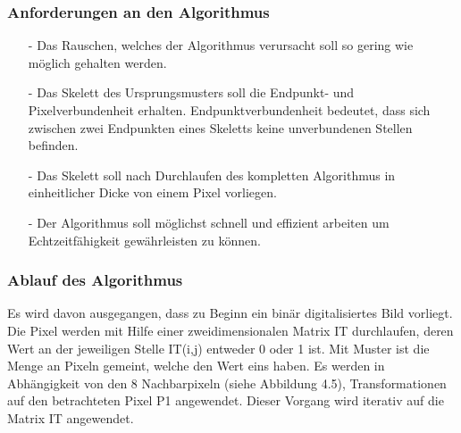 \subsubsection{Anforderungen an den Algorithmus}

\begin{itemize}
\item[-] Das Rauschen, welches der Algorithmus verursacht soll so gering wie möglich gehalten werden.
\item[-] Das Skelett des Ursprungsmusters soll die Endpunkt- und Pixelverbundenheit erhalten.
Endpunktverbundenheit bedeutet, dass sich zwischen zwei Endpunkten eines Skeletts keine unverbundenen Stellen befinden.
\item[-] Das Skelett soll nach Durchlaufen des kompletten Algorithmus in einheitlicher Dicke von einem Pixel vorliegen.
\item[-] Der Algorithmus soll möglichst schnell und effizient arbeiten um Echtzeitfähigkeit gewährleisten zu können. \\
\end{itemize}

\subsubsection{Ablauf des Algorithmus}

Es wird davon ausgegangen, dass zu Beginn ein binär digitalisiertes Bild vorliegt.
Die Pixel werden mit Hilfe einer zweidimensionalen Matrix IT durchlaufen, deren Wert an der jeweiligen Stelle IT(i,j) entweder 0 oder 1 ist.
Mit Muster ist die Menge an Pixeln gemeint, welche den Wert eins haben.
Es werden in Abhängigkeit von den 8 Nachbarpixeln (siehe Abbildung 4.5), Transformationen auf den betrachteten Pixel P1 angewendet. Dieser Vorgang wird iterativ auf die Matrix IT angewendet.

